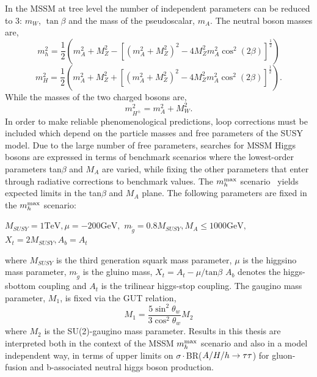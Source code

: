In the MSSM at tree level the number of independent parameters can be reduced to 3: $m_{W}$,
$\tan{\beta}$ and the mass of the pseudoscalar, $m_{A}$. The neutral boson masses are,
\begin{equation}
m_{h}^{2}=\frac{1}{2}\left(m_{A}^{2}+M_{Z}^{2}-\left[(m_{A}^{2}+
M_{Z}^{2})^{2}-4M_{Z}^{2}m_{A}^{2}\cos^{2}{(2\beta)}\right]^{\frac{1}{2}}\right)
\end{equation}
\nobreak
\begin{equation}
m_{H}^{2}=\frac{1}{2}\left(m_{A}^{2}+M_{Z}^{2}+\left[(m_{A}^{2}+
M_{Z}^{2})^{2}-4M_{Z}^{2}m_{A}^{2}\cos^{2}{(2\beta)}\right]^{\frac{1}{2}}\right).
\end{equation}
While the masses of the two charged bosons are,
\begin{equation}
m_{H^{\pm}}^{2}=m_{A}^{2}+M_{W}^{2}.
\end{equation}
In order to make reliable phenomenological predictions, loop corrections must be included
which depend on the particle masses and free parameters of the SUSY model.
Due to the large number of free parameters,
searches for MSSM Higgs bosons are expressed in terms of benchmark scenarios where 
the lowest-order parameters tan$\beta$ and $M_A$ are varied, while fixing the other parameters that 
enter through radiative corrections to benchmark values. 
The $m_{h}^{\rm max}$ scenario~\cite{MHMAX-Carena,MHMAX-Carena-2002}
yields expected limits in the tan$\beta$ and $M_A$ plane. %
The following parameters are fixed in the $m_{h}^{\rm max}$ scenario:
\begin{center}
$
M_{SUSY} = 1 \mathrm{TeV}, 
\mu=-200 \mathrm{GeV}, 
$
\linebreak[4]
$
m_{\tilde{g}}=0.8 M_{SUSY}, 
M_{A} \leq 1000 \mathrm{GeV}, 
$
\linebreak[4]
$
X_{t}=2M_{SUSY}, 
A_{b} = A_{t}
$
\end{center}
where 
$M_{SUSY}$ is the third generation squark mass parameter,
$\mu$ is the higgsino mass parameter,
$m_{\tilde{g}}$ is the gluino mass,
$X_{t}= A_{t}-\mu/\mathrm{tan}\beta$
$A_{b}$ denotes the higgs-sbottom coupling and
$A_{t}$ is the trilinear higgs-stop coupling.
The gaugino mass parameter, $M_{1}$, is fixed via the GUT relation,
\begin{equation} 
M_{1}=\frac{5\sin^{2}{\theta_{w}}}{3\cos^{2}{\theta_{w}}}M_{2}
\end{equation}
where $M_{2}$ is the SU(2)-gaugino mass parameter.
Results in this thesis are interpreted both in the context of the MSSM 
$m_{h}^{\rm max}$ scenario and also in a model independent way, 
in terms of upper limits on $\sigma\cdot$BR($A\slash H\slash h\rightarrow\mathrm{\tau}\mathrm{\tau}$) for 
gluon-fusion and b-associated neutral higgs boson production.

